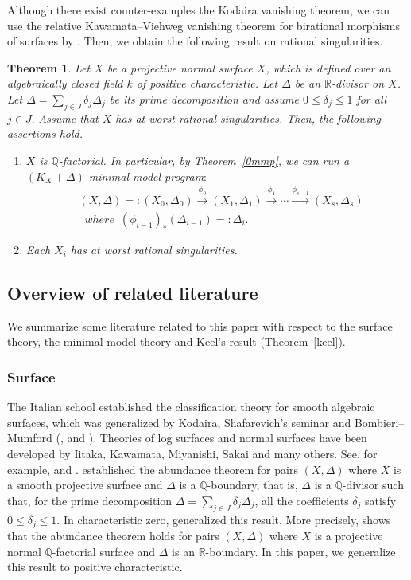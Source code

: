 \documentclass[12pt,twoside]{amsart}
\newtheorem{thm}{Theorem}[section]
\theoremstyle{definition}
\newcommand{\Q}{$\mathbb{Q}$}
\newcommand{\R}{$\mathbb{R}$}
\begin{document}
Although there exist counter-examples the Kodaira vanishing theorem, 
we can use the relative Kawamata--Viehweg vanishing theorem for birational morphisms of surfaces 
by \cite{KK}. 
Then, we obtain the following result on rational singularities. 

\begin{thm}\label{0rational}
Let $X$ be a projective normal surface $X$, 
which is defined over an algebraically closed field $k$ of positive characteristic. 
Let $\Delta$ be an $\mathbb{R}$-divisor on $X$. 
Let $\Delta=\sum_{j\in J}\delta_j\Delta_j$ be its prime decomposition and 
assume  $0\leq \delta_j\leq 1$ for all $j\in J.$ 
Assume that  $X$ has at worst rational singularities. 
Then, the following assertions hold.
\begin{enumerate}
\item{$X$ is \Q-factorial. In particular, by Theorem~\ref{0mmp}, 
we can run a $(K_X+\Delta)$-minimal model program$:$
\begin{eqnarray*}
&(X, \Delta)=:(X_0, \Delta_0) \overset{\phi_0}\to 
(X_1, \Delta_1) \overset{\phi_1}\to \cdots 
\overset{\phi_{s-1}}\to (X_s, \Delta_s)\\
&\,\,\,where\,\,\,(\phi_{i-1})_*(\Delta_{i-1})=:\Delta_i.
\end{eqnarray*}}
\item{Each $X_i$ has at worst rational singularities.}
\end{enumerate}
\end{thm}



\subsection{Overview of related literature}
We summarize some literature related to this paper with respect to 
the surface theory, the minimal model theory and Keel's result (Theorem~\ref{keel}). 

\subsubsection{Surface}
The Italian school established the classification theory for smooth algebraic surfaces, 
which was generalized by Kodaira, Shafarevich's seminar and Bombieri--Mumford 
(\cite{Mum}, \cite{BMII} and \cite{BMIII}). 
Theories of log surfaces and normal surfaces have been developed by 
Iitaka, Kawamata, Miyanishi, Sakai and many others. 
See, for example, 
\cite{Sakai} and \cite{Miyanishi}. 
\cite{Fujita} established the abundance theorem 
for pairs $(X, \Delta)$ where $X$ is a smooth projective surface 
and $\Delta$ is a \Q-boundary, that is, 
$\Delta$ is a \Q-divisor such that, for the prime decomposition $\Delta=\sum_{j\in J}\delta_j\Delta_j$, 
all the coefficients $\delta_j$ satisfy $0\leq\delta_j\leq 1$. 
In characteristic zero, \cite{Fujino} generalized this result. 
More precisely, \cite{Fujino} shows that 
the abundance theorem holds 
for pairs $(X, \Delta)$ where 
$X$ is a projective normal \Q-factorial surface and $\Delta$ is an \R-boundary. 
In this paper, we generalize this result to positive characteristic. 
\end{document}
